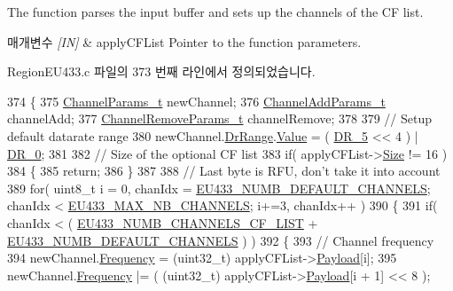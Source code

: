 The function parses the input buffer and sets up the channels of the CF list. 


\begin{DoxyParams}{매개변수}
{\em \mbox{[}\+I\+N\mbox{]}} & apply\+C\+F\+List Pointer to the function parameters. \\
\hline
\end{DoxyParams}


Region\+E\+U433.\+c 파일의 373 번째 라인에서 정의되었습니다.


\begin{DoxyCode}
374 \{
375     \mbox{\hyperlink{structs_channel_params}{ChannelParams\_t}} newChannel;
376     \mbox{\hyperlink{structs_channel_add_params}{ChannelAddParams\_t}} channelAdd;
377     \mbox{\hyperlink{structs_channel_remove_params}{ChannelRemoveParams\_t}} channelRemove;
378 
379     \textcolor{comment}{// Setup default datarate range}
380     newChannel.\mbox{\hyperlink{structs_channel_params_ad4d9b041ea740886a05fa8a1d06997a2}{DrRange}}.\mbox{\hyperlink{unionu_dr_range_ae1e3e8696366e3256e397bbdc4e34775}{Value}} = ( \mbox{\hyperlink{group___r_e_g_i_o_n_ga872e12c82020c02a7f70a1c6ed1375df}{DR\_5}} << 4 ) | \mbox{\hyperlink{group___r_e_g_i_o_n_ga6c4ef966b4f3d5eb7597b087f2b97095}{DR\_0}};
381 
382     \textcolor{comment}{// Size of the optional CF list}
383     \textcolor{keywordflow}{if}( applyCFList->\mbox{\hyperlink{structs_apply_c_f_list_params_ace31de7598e85e87624c4e7d8e5d112c}{Size}} != 16 )
384     \{
385         \textcolor{keywordflow}{return};
386     \}
387 
388     \textcolor{comment}{// Last byte is RFU, don't take it into account}
389     \textcolor{keywordflow}{for}( uint8\_t i = 0, chanIdx = \mbox{\hyperlink{group___r_e_g_i_o_n_e_u433_ga5458d9fd6043a733e6a28f5f30ace167}{EU433\_NUMB\_DEFAULT\_CHANNELS}}; chanIdx < 
      \mbox{\hyperlink{group___r_e_g_i_o_n_e_u433_ga800fbd07b871c93758364a0311b87937}{EU433\_MAX\_NB\_CHANNELS}}; i+=3, chanIdx++ )
390     \{
391         \textcolor{keywordflow}{if}( chanIdx < ( \mbox{\hyperlink{group___r_e_g_i_o_n_e_u433_ga97fb06ddf8a39eba531d145336aa7b5f}{EU433\_NUMB\_CHANNELS\_CF\_LIST}} + 
      \mbox{\hyperlink{group___r_e_g_i_o_n_e_u433_ga5458d9fd6043a733e6a28f5f30ace167}{EU433\_NUMB\_DEFAULT\_CHANNELS}} ) )
392         \{
393             \textcolor{comment}{// Channel frequency}
394             newChannel.\mbox{\hyperlink{structs_channel_params_ade3d190636488dad9a89b19446b7acf1}{Frequency}} = (uint32\_t) applyCFList->\mbox{\hyperlink{structs_apply_c_f_list_params_a3dfbfe76c8f3bd25765750487b815147}{Payload}}[i];
395             newChannel.\mbox{\hyperlink{structs_channel_params_ade3d190636488dad9a89b19446b7acf1}{Frequency}} |= ( (uint32\_t) applyCFList->\mbox{\hyperlink{structs_apply_c_f_list_params_a3dfbfe76c8f3bd25765750487b815147}{Payload}}[i + 1] << 8 );

\end{DoxyCode}
